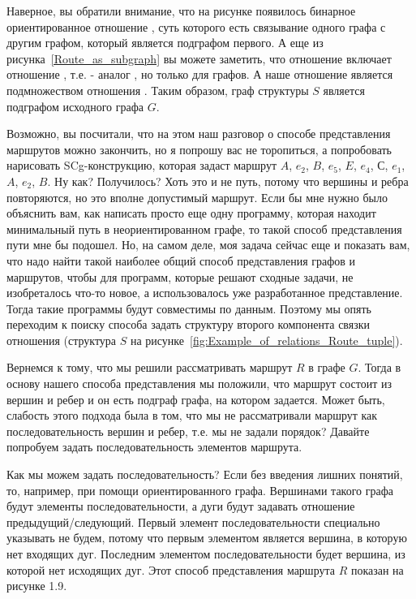 Наверное, вы обратили внимание, что на рисунке появилось бинарное
ориентированное отношение , суть которого есть
связывание одного графа с другим графом, который является подграфом
первого. А еще из рисунка~\ref{Route_as_subgraph} вы можете заметить,
что отношение  включает отношение ,
т.е.  - аналог , но только для
графов. А наше отношение  является подмножеством
отношения . Таким образом, граф структуры $S$ является
подграфом исходного графа $G$.

Возможно, вы посчитали, что на этом наш разговор о способе
представления маршрутов можно закончить, но я попрошу вас не
торопиться, а попробовать нарисовать SCg-конструкцию, которая задаст
маршрут $A$, $e_2$, $B$, $e_5$, $E$, $e_4$, $С$, $e_1$, $A$, $e_2$,
$B$. Ну как? Получилось? Хоть это и не путь, потому что вершины и
ребра повторяются, но это вполне допустимый маршрут. Если бы мне нужно
было объяснить вам, как написать просто еще одну программу, которая
находит минимальный путь в неориентированном графе, то такой способ
представления пути мне бы подошел. Но, на самом деле, моя задача
сейчас еще и показать вам, что надо найти такой наиболее общий способ
представления графов и маршрутов, чтобы для программ, которые решают
сходные задачи, не изобреталось что-то новое, а использовалось уже
разработанное представление. Тогда такие программы будут совместимы по
данным. Поэтому мы опять переходим к поиску способа задать структуру
второго компонента связки отношения  (структура $S$ на
рисунке~\ref{fig:Example_of_relations_Route_tuple}).

Вернемся к тому, что мы решили рассматривать маршрут $R$ в графе
$G$. Тогда в основу нашего способа представления мы положили, что
маршрут состоит из вершин и ребер и он есть подграф графа, на котором
задается. Может быть, слабость этого подхода была в том, что мы не
рассматривали маршрут как последовательность вершин и ребер, т.е. мы
не задали порядок? Давайте попробуем задать последовательность
элементов маршрута.

Как мы можем задать последовательность? Если без введения лишних
понятий, то, например, при помощи ориентированного графа. Вершинами
такого графа будут элементы последовательности, а дуги будут задавать
отношение предыдущий/следующий. Первый элемент последовательности
специально указывать не будем, потому что первым элементом является
вершина, в которую нет входящих дуг. Последним элементом
последовательности будет вершина, из которой нет исходящих дуг. Этот
способ представления маршрута $R$ показан на рисунке 1.9.


